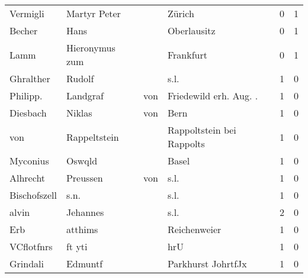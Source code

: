 \begin{tabular}{llllrr}
                 Vermigli &                       Martyr Peter &             &                                      Zürich &          0 &         1 \\
                   Becher &                               Hans &             &                                 Oberlausitz &          0 &         1 \\
                     Lamm &                     Hieronymus zum &             &                                   Frankfurt &          0 &         1 \\
                Ghralther &                             Rudolf &             &                                        s.l. &          1 &         0 \\
                 Philipp. &                           Landgraf &         von &                     Friedewild erh. Aug. .  &          1 &         0 \\
                 Diesbach &                             Niklas &         von &                                        Bern &          1 &         0 \\
                      von &                       Rappeltstein &             &                   Rappoltstein bei Rappolts &          1 &         0 \\
                 Myconius &                             Oswqld &             &                                       Basel &          1 &         0 \\
                 Alhrecht &                           Preussen &         von &                                        s.l. &          1 &         0 \\
             Bischofszell &                               s.n. &             &                                        s.l. &          1 &         0 \\
                    alvin &                           Jehannes &             &                                        s.l. &          2 &         0 \\
                      Erb &                            atthims &             &                                Reichenweier &          1 &         0 \\
               VCflotfnrs &                             ft yti &             &                                         hrU &          1 &         0 \\
                 Grindali &                            Edmuntf &             &                          Parkhurst JohrtfJx &          1 &         0 \\

\end{tabular}

